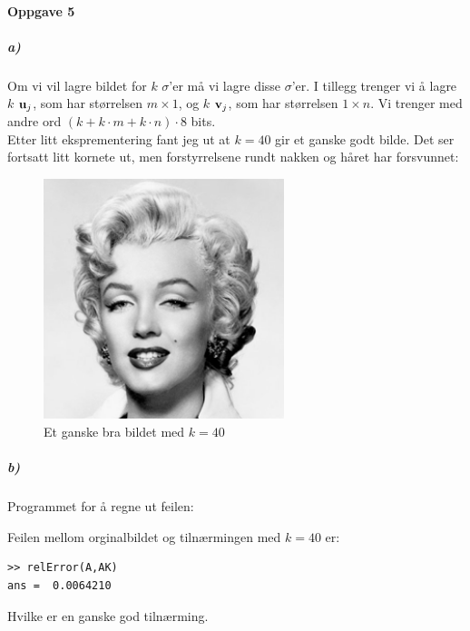\documentclass[a4paper,norsk, 10pt]{article}
\begin{document}
\paragraph*{Oppgave 5}

\subparagraph*{a)}

Om vi vil lagre bildet for $k$ $\sigma$'er må vi lagre disse $\sigma$'er. I tillegg trenger vi å lagre $k$ $\bold{u}_j$, som har størrelsen $m \times 1$, og $k$ $\bold{v}_j$, som har størrelsen $1 \times n$. Vi trenger med andre ord $(k + k\cdot m + k\cdot n)\cdot 8$ bits.\\ 

Etter litt eksprementering fant jeg ut at $k = 40$ gir et ganske godt bilde. Det ser fortsatt litt kornete ut, men forstyrrelsene rundt nakken og håret har forsvunnet:

\begin{figure}[H]
\begin{center}
\includegraphics[width = 70mm]{k40.png}
\caption{Et ganske bra bildet med $k = 40$}
\end{center}
\end{figure}

\subparagraph*{b)}

Programmet for å regne ut feilen:



Feilen mellom orginalbildet og tilnærmingen med $k = 40$ er:

\begin{verbatim}
>> relError(A,AK)
ans =  0.0064210
\end{verbatim}

Hvilke er en ganske god tilnærming.
\end{document}
